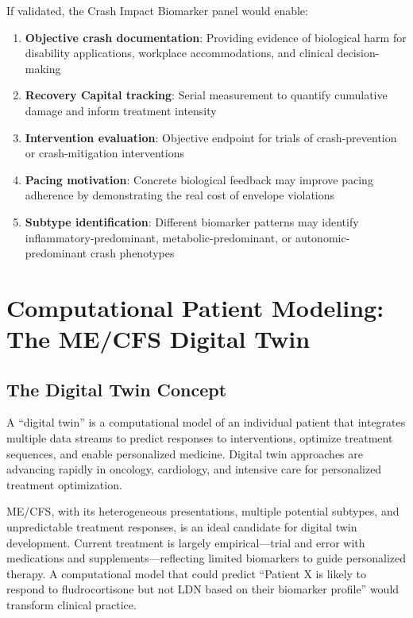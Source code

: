 If validated, the Crash Impact Biomarker panel would enable:

\begin{enumerate}
    \item \textbf{Objective crash documentation}: Providing evidence of biological harm for disability applications, workplace accommodations, and clinical decision-making
    \item \textbf{Recovery Capital tracking}: Serial measurement to quantify cumulative damage and inform treatment intensity
    \item \textbf{Intervention evaluation}: Objective endpoint for trials of crash-prevention or crash-mitigation interventions
    \item \textbf{Pacing motivation}: Concrete biological feedback may improve pacing adherence by demonstrating the real cost of envelope violations
    \item \textbf{Subtype identification}: Different biomarker patterns may identify inflammatory-predominant, metabolic-predominant, or autonomic-predominant crash phenotypes
\end{enumerate}

\section{Computational Patient Modeling: The ME/CFS Digital Twin}
\label{sec:digital-twin}

\subsection{The Digital Twin Concept}

A ``digital twin'' is a computational model of an individual patient that integrates multiple data streams to predict responses to interventions, optimize treatment sequences, and enable personalized medicine. Digital twin approaches are advancing rapidly in oncology, cardiology, and intensive care for personalized treatment optimization.

ME/CFS, with its heterogeneous presentations, multiple potential subtypes, and unpredictable treatment responses, is an ideal candidate for digital twin development. Current treatment is largely empirical---trial and error with medications and supplements---reflecting limited biomarkers to guide personalized therapy. A computational model that could predict ``Patient X is likely to respond to fludrocortisone but not LDN based on their biomarker profile'' would transform clinical practice.

